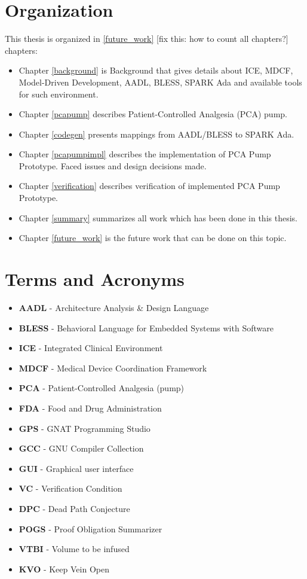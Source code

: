 \section{Organization}
\label{introduction:organization}
This thesis is organized in \ref{future_work} [fix this: how to count all chapters?] chapters:
\begin{itemize}
	\item Chapter \ref{background} is Background that gives details about ICE, MDCF, Model-Driven Development, AADL, BLESS, SPARK Ada and available tools for such environment. 
	\item Chapter \ref{pcapump} describes Patient-Controlled Analgesia (PCA) pump.
	\item Chapter \ref{codegen} presents mappings from AADL/BLESS to SPARK Ada. 
	\item Chapter \ref{pcapumpimpl} describes the implementation of PCA Pump Prototype. Faced issues and design decisions made.
	\item Chapter \ref{verification} describes verification of implemented PCA Pump Prototype. 
	\item Chapter \ref{summary} summarizes all work which has been done in this thesis. 
	\item Chapter \ref{future_work} is the future work that can be done on this topic.
\end{itemize}


\section{Terms and Acronyms}
\label{introduction:terms}

\begin{itemize}
	\item \textbf{AADL} - Architecture Analysis \& Design Language
	\item \textbf{BLESS} - Behavioral Language for Embedded Systems with Software
	\item \textbf{ICE} - Integrated Clinical Environment
	\item \textbf{MDCF} - Medical Device Coordination Framework
	\item \textbf{PCA} - Patient-Controlled Analgesia (pump)
	\item \textbf{FDA} - Food and Drug Administration
	\item \textbf{GPS} - GNAT Programming Studio
	\item \textbf{GCC} - GNU Compiler Collection
	\item \textbf{GUI} - Graphical user interface
	\item \textbf{VC} - Verification Condition
	\item \textbf{DPC} - Dead Path Conjecture
	\item \textbf{POGS} - Proof Obligation Summarizer
	\item \textbf{VTBI} - Volume to be infused
	\item \textbf{KVO} - Keep Vein Open
\end{itemize}